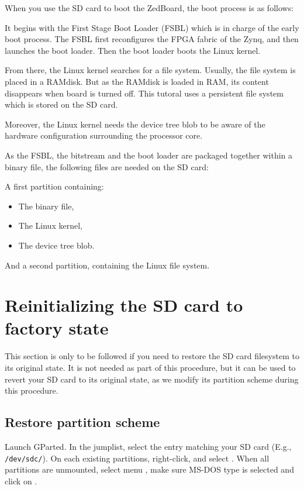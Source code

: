 \documentclass[openany,a4paper]{book}
\begin{document}
When you use the SD card to boot the ZedBoard, the boot process is as follows:

It begins with the First Stage Boot Loader (FSBL) which is in charge of the early boot process.
The FSBL first reconfigures the FPGA fabric of the Zynq, and then launches the boot loader.
Then the boot loader boots the Linux kernel.

From there, the Linux kernel searches for a file system.
Usually, the file system is placed in a RAMdisk.
But as the RAMdisk is loaded in RAM, its content disappears when board is turned off.
This tutoral uses a persistent file system which is stored on the SD card.

Moreover, the Linux kernel needs the device tree blob to be aware of the hardware configuration surrounding the processor core.

As the FSBL, the bitstream and the boot loader are packaged together within a binary file, the following files are needed on the SD card:

A first partition containing:
\begin{itemize}
 \item The binary file,
 \item The Linux kernel,
 \item The device tree blob.
\end{itemize}

And a second partition, containing the Linux file system.


\section{Reinitializing the SD card to factory state}

This section is only to be followed if you need to restore the SD card filesystem to its original state.
It is not needed as part of this procedure, but it can be used to revert your SD card to its original state, as we modify its partition scheme during this procedure.

\subsection{Restore partition scheme}

Launch GParted.
In the jumplist, select the entry matching your SD card (E.g., \nolinkurl{/dev/sdc/}).
On each existing partitions, right-click, and select .
When all partitions are unmounted, select menu , make sure MS-DOS type is selected and click on .
\end{document}
